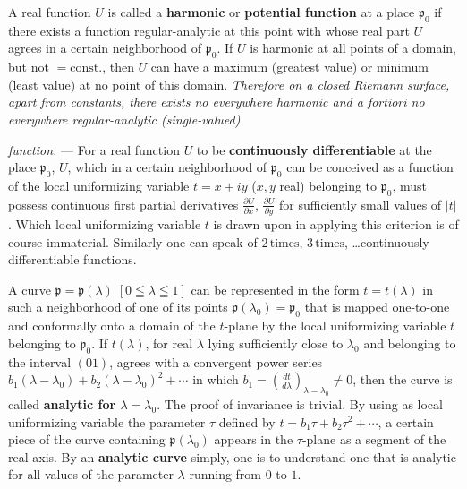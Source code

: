 \documentclass{article}
\begin{document}
A real function $U$ is called a \textbf{harmonic} or \textbf{potential function} at a place $\mathfrak{p}_0$ if there exists a function regular-analytic at this point with whose real part $U$ agrees in a certain neighborhood of $\mathfrak{p}_0$. If $U$ is harmonic at all points of a domain, but not $=\mathrm{const.}$, then $U$ can have a maximum (greatest value) or minimum (least value) at no point of this domain. \emph{Therefore on a closed Riemann surface, apart from constants, there exists no everywhere harmonic and a fortiori no everywhere regular-analytic (single-valued)}

\emph{function.} --- For a real function $U$ to be \textbf{continuously differentiable} at the place $\mathfrak{p}_0$, $U$, which in a certain neighborhood of $\mathfrak{p}_0$ can be conceived as a function of the local uniformizing variable $t = x + iy$ ($x, y$ real) belonging to $\mathfrak{p}_0$, must possess continuous first partial derivatives $\frac{\partial U}{\partial x}$, $\frac{\partial U}{\partial y}$ for sufficiently small values of $|t|$. Which local uniformizing variable $t$ is drawn upon in applying this criterion is of course immaterial. Similarly one can speak of $2\,\text{times}$, $3\,\text{times}$, \ldots continuously differentiable functions.

A curve $\mathfrak{p} = \mathfrak{p}(\lambda)\;[0 \leqq \lambda \leqq 1]$ can be represented in the form $t = t(\lambda)$ in such a neighborhood of one of its points $\mathfrak{p}(\lambda_0) = \mathfrak{p}_0$ that is mapped one-to-one and conformally onto a domain of the $t$-plane by the local uniformizing variable $t$ belonging to $\mathfrak{p}_0$. If $t(\lambda)$, for real $\lambda$ lying sufficiently close to $\lambda_0$ and belonging to the interval $(01)$, agrees with a convergent power series $b_1 (\lambda - \lambda_0) + b_2 (\lambda - \lambda_0)^2 + \cdots$ in which $b_1 = \left(\frac{dt}{d\lambda}\right)_{\lambda = \lambda_0} \neq 0$, then the curve is called \textbf{analytic for $\lambda = \lambda_0$}. The proof of invariance is trivial. By using as local uniformizing variable the parameter $\tau$ defined by $t = b_1 \tau + b_2 \tau^2 + \cdots$, a certain piece of the curve containing $\mathfrak{p}(\lambda_0)$ appears in the $\tau$-plane as a segment of the real axis. By an \textbf{analytic curve} simply, one is to understand one that is analytic for all values of the parameter $\lambda$ running from $0$ to $1$.
\end{document}
